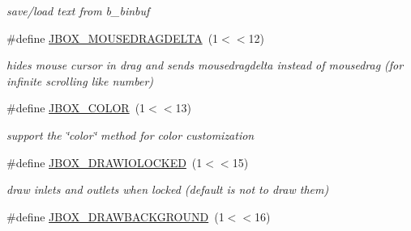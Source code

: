 \begin{DoxyCompactItemize}
\begin{DoxyCompactList}\small\item\em save/load text from b\_\-binbuf \item\end{DoxyCompactList}\item 
\hypertarget{group__jbox_ga31038b9d4b011ec2e594c0cfc49ac1a0}{
\#define \hyperlink{group__jbox_ga31038b9d4b011ec2e594c0cfc49ac1a0}{JBOX\_\-MOUSEDRAGDELTA}~(1$<$$<$12)}
\label{group__jbox_ga31038b9d4b011ec2e594c0cfc49ac1a0}

\begin{DoxyCompactList}\small\item\em hides mouse cursor in drag and sends mousedragdelta instead of mousedrag (for infinite scrolling like number) \item\end{DoxyCompactList}\item 
\hypertarget{group__jbox_ga14cb28210886cfe0df0c34f71338faf8}{
\#define \hyperlink{group__jbox_ga14cb28210886cfe0df0c34f71338faf8}{JBOX\_\-COLOR}~(1$<$$<$13)}
\label{group__jbox_ga14cb28210886cfe0df0c34f71338faf8}

\begin{DoxyCompactList}\small\item\em support the \char`\"{}color\char`\"{} method for color customization \item\end{DoxyCompactList}\item 
\hypertarget{group__jbox_gaec3b8ac2f1d39181714818573dbb3050}{
\#define \hyperlink{group__jbox_gaec3b8ac2f1d39181714818573dbb3050}{JBOX\_\-DRAWIOLOCKED}~(1$<$$<$15)}
\label{group__jbox_gaec3b8ac2f1d39181714818573dbb3050}

\begin{DoxyCompactList}\small\item\em draw inlets and outlets when locked (default is not to draw them) \item\end{DoxyCompactList}\item 
\hypertarget{group__jbox_ga73e68b629cf1778a8a6e7a6685d98df6}{
\#define \hyperlink{group__jbox_ga73e68b629cf1778a8a6e7a6685d98df6}{JBOX\_\-DRAWBACKGROUND}~(1$<$$<$16)}
\label{group__jbox_ga73e68b629cf1778a8a6e7a6685d98df6}


\end{DoxyCompactItemize}
